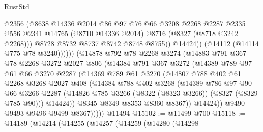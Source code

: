 \begin{lexlean}{RustStd}
\begin{coremodule}
                          @2356
                          (@8638
                            @14336
                            @2014
                            @86
                            @97
                            @76
                            @66
                            @3208
                            @2268
                            @2287
                            @2335
                            @556
                            @2341
                            @14765
                            (@8710 @14336 @2014)
                            @8716
                            (@8327 (@8718 @3242 @2268)))
                          @8728
                          @8732
                          @8737
                          @8742
                          @8748
                          @8755))
                      @14424))
                  (@14112 (@14114 @775 @78 @3240))))))
          (@14878
            @792
            @78
            @2268
            @3274
            (@14883
              @791
              @367
              @78
              @2268
              @3272
              @2027
              @806
              (@14384
                @791
                @367
                @3272
                (@14389
                  @789
                  @97
                  @61
                  @66
                  @3270
                  @2287
                  (@14369
                    @789
                    @61
                    @3270
                    (@14807
                      @788
                      @402
                      @61
                      @2268
                      @3268
                      @2027
                      @408
                      (@14384
                        @788
                        @402
                        @3268
                        (@14389
                          @786
                          @97
                          @90
                          @66
                          @3266
                          @2287
                          (@14826 @785 @3266 (@8322 (@8323 @3266)) (@8327 (@8329 @785 @90)))
                          @14424))
                      @8345
                      @8349
                      @8353
                      @8360
                      @8367))
                  @14424))
              @9490
              @9493
              @9496
              @9499
              @8367)))))
    @11494
@15102 := @11499 @700
@15118 := @14189
    (@14214
      (@14255
        (@14257
          (@14259
            (@14280
              (@14298

\end{coremodule}
\end{lexlean}
